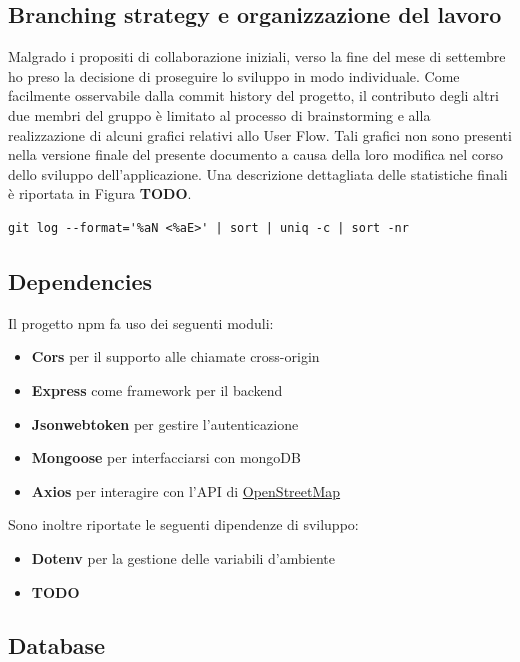 \documentclass[9pt]{extarticle}
\begin{document}
\subsection{Branching strategy e organizzazione del lavoro}

Malgrado i propositi di collaborazione iniziali, verso la fine del mese di
settembre ho preso la decisione di proseguire lo sviluppo in modo individuale.
Come facilmente osservabile dalla commit history del progetto, il contributo
degli altri due membri del gruppo è limitato al processo di brainstorming e
alla realizzazione di alcuni grafici relativi allo User Flow. Tali grafici non
sono presenti nella versione finale del presente documento a causa della loro
modifica nel corso dello sviluppo dell'applicazione. Una descrizione dettagliata
delle statistiche finali è riportata in Figura \textbf{TODO}.



\begin{verbatim}
git log --format='%aN <%aE>' | sort | uniq -c | sort -nr
\end{verbatim}



\subsection{Dependencies}

Il progetto npm fa uso dei seguenti moduli:
\begin{itemize}
    \item \textbf{Cors} per il supporto alle chiamate cross-origin
    \item \textbf{Express} come framework per il backend
    \item \textbf{Jsonwebtoken} per gestire l'autenticazione
    \item \textbf{Mongoose} per interfacciarsi con mongoDB
    \item \textbf{Axios} per interagire con l'API di \href{https://www.openstreetmap.org/#map=6/42.09/12.56}{OpenStreetMap}
\end{itemize}

Sono inoltre riportate le seguenti dipendenze di sviluppo:
\begin{itemize}
    \item \textbf{Dotenv} per la gestione delle variabili d'ambiente
    \item \textbf{TODO}
\end{itemize}

\subsection{Database}
\end{document}
